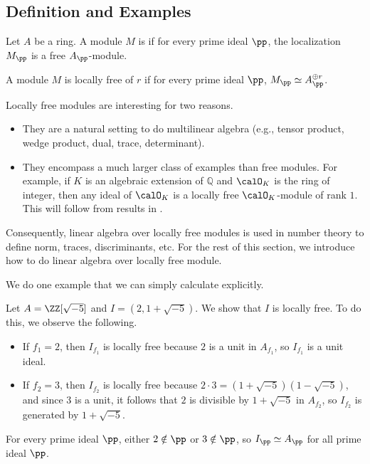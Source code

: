 \subsection{Definition and Examples}
\begin{definition}
    Let $A$ be a ring. A module $M$ is 
    if for every prime ideal $\pp$,
    the localization $M_\pp$ is a free $A_\pp$-module.

    A module $M$ is locally free of  $r$
    if for every prime ideal $\pp$,
    $M_\pp\simeq A_\pp^{\oplus r}$.
\end{definition}
Locally free modules are interesting for two reasons.
\begin{itemize}
    \item They are a natural setting to do multilinear algebra
    (e.g., tensor product, wedge product, dual, trace, determinant).
    \item They encompass a much larger class of examples
    than free modules. For example, if $K$ is 
    an algebraic extension of $\mathbb Q$
    and $\calO_K$ is the ring of integer,
    then any ideal of $\calO_K$ is a locally free
    $\calO_K$-module of rank $1$. 
    This will follow from results in .
\end{itemize}
Consequently, linear algebra over locally free modules
is used in number theory to define norm,
traces, discriminants, etc.
For the rest of this section, we introduce how to do
linear algebra over locally free module.

We do one example that we can simply calculate explicitly.
\begin{example}
    Let $A = \ZZ[\sqrt{-5}]$ and $I=(2,1+\sqrt{-5})$.
    We show that $I$ is locally free.
    To do this, we observe the following.
    \begin{itemize}
    \item If $f_1=2$, then $I_{f_1}$ is locally free
    because $2$ is a unit in $A_{f_1}$,
    so $I_{f_1}$ is a unit ideal.
    \item If $f_2=3$, then $I_{f_2}$ is locally free
    because $2\cdot 3 = (1+\sqrt{-5})(1-\sqrt{-5})$,
    and since $3$ is a unit, it follows that 
    $2$ is divisible by $1+\sqrt{-5}$ in $A_{f_2}$,
    so $I_{f_2}$ is generated by $1+\sqrt{-5}$.
    \end{itemize}
    For every prime ideal $\pp$,
    either $2\notin \pp$ or $3\notin\pp$, 
    so $I_\pp\simeq A_\pp$ for all prime ideal $\pp$.
\end{example}
